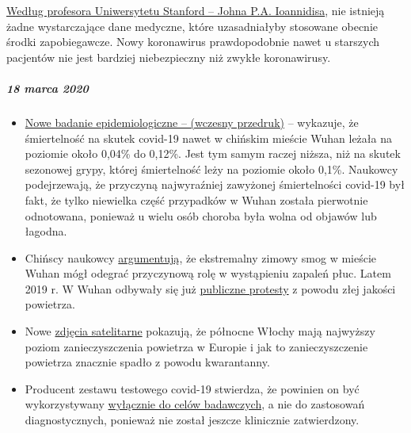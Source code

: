 \href{https://www.statnews.com/2020/03/17/a-fiasco-in-the-making-as-the-coronavirus-pandemic-takes-hold-we-are-making-decisions-without-reliable-data/}{Według
profesora Uniwersytetu Stanford -- Johna P.A. Ioannidisa}, nie istnieją
żadne wystarczające dane medyczne, które uzasadniałyby stosowane obecnie
środki zapobiegawcze. Nowy koronawirus prawdopodobnie nawet u starszych
pacjentów nie jest bardziej niebezpieczny niż zwykłe koronawirusy.

\hypertarget{18-marca-2020}{%
\subparagraph{\texorpdfstring{\textbf{18 marca
2020}}{18 marca 2020}}\label{18-marca-2020}}

\begin{itemize}
\tightlist
\item
  \href{https://www.medrxiv.org/content/10.1101/2020.02.12.20022434v2}{Nowe
  badanie epidemiologiczne -- (wczesny przedruk)} -- wykazuje, że
  śmiertelność na skutek covid-19 nawet w chińskim mieście Wuhan leżała
  na poziomie około 0,04\% do 0,12\%. Jest tym samym raczej niższa, niż
  na skutek sezonowej grypy, której śmiertelność leży na poziomie około
  0,1\%. Naukowcy podejrzewają, że przyczyną najwyraźniej zawyżonej
  śmiertelności covid-19 był fakt, że tylko niewielka część przypadków w
  Wuhan została pierwotnie odnotowana, ponieważ u wielu osób choroba
  była wolna od objawów lub łagodna.
\item
  Chińscy naukowcy
  \href{https://www.eurasiareview.com/01022020-polluted-air-could-be-an-important-cause-of-wuhan-pneumonia-oped/}{argumentują},
  że ekstremalny zimowy smog w mieście Wuhan mógł odegrać przyczynową
  rolę w wystąpieniu zapaleń płuc. Latem 2019 r. W Wuhan odbywały się
  już
  \href{https://www.cnn.com/2019/07/10/asia/china-wuhan-pollution-problems-intl-hnk/index.html}{publiczne
  protesty} z powodu złej jakości powietrza.
\item
  Nowe \href{https://twitter.com/esa/status/1238480433047916545}{zdjęcia
  satelitarne} pokazują, że północne Włochy mają najwyższy poziom
  zanieczyszczenia powietrza w Europie i jak to zanieczyszczenie
  powietrza znacznie spadło z powodu kwarantanny.
\item
  Producent zestawu testowego covid-19 stwierdza, że powinien on być
  wykorzystywany
  \href{https://www.creative-diagnostics.com/sars-cov-2-coronavirus-multiplex-rt-qpcr-kit-277854-457.htm}{wyłącznie
  do celów badawczych}, a nie do zastosowań diagnostycznych, ponieważ
  nie został jeszcze klinicznie zatwierdzony.
\end{itemize}

